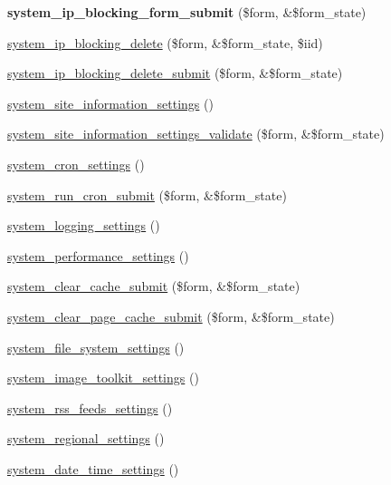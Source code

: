 \begin{DoxyCompactItemize}
\item 
\hypertarget{system_8admin_8inc_ac75ebe994ba888d8792bea1a8a37cf1e}{
{\bfseries system\_\-ip\_\-blocking\_\-form\_\-submit} (\$form, \&\$form\_\-state)}
\label{system_8admin_8inc_ac75ebe994ba888d8792bea1a8a37cf1e}

\item 
\hyperlink{system_8admin_8inc_a15ba20664b3e8b66e0f0a4d8b54e2f60}{system\_\-ip\_\-blocking\_\-delete} (\$form, \&\$form\_\-state, \$iid)
\item 
\hyperlink{system_8admin_8inc_af7847cfa490010815a7f39b139aececc}{system\_\-ip\_\-blocking\_\-delete\_\-submit} (\$form, \&\$form\_\-state)
\item 
\hyperlink{group__forms_ga80e6b3130e47d51243151f1aa04742a3}{system\_\-site\_\-information\_\-settings} ()
\item 
\hyperlink{system_8admin_8inc_abf9e67e3196d40a164cfacba18613b28}{system\_\-site\_\-information\_\-settings\_\-validate} (\$form, \&\$form\_\-state)
\item 
\hyperlink{group__forms_ga62cfa00c0b29765c5c4fa670e222b522}{system\_\-cron\_\-settings} ()
\item 
\hyperlink{group__forms_ga81d2d4dbfd508cdcafdd808cda332b7c}{system\_\-run\_\-cron\_\-submit} (\$form, \&\$form\_\-state)
\item 
\hyperlink{group__forms_ga3404b7ca761c74436c88ce61aa664c4d}{system\_\-logging\_\-settings} ()
\item 
\hyperlink{group__forms_ga47b1f34bfff2f44fd22cfc866bff59d7}{system\_\-performance\_\-settings} ()
\item 
\hyperlink{group__forms_ga07cc959f377e07b079d9875fc5c4b1b7}{system\_\-clear\_\-cache\_\-submit} (\$form, \&\$form\_\-state)
\item 
\hyperlink{group__forms_ga583e36fa591f3e82feae6bf41b597aac}{system\_\-clear\_\-page\_\-cache\_\-submit} (\$form, \&\$form\_\-state)
\item 
\hyperlink{group__forms_gab0199bde08bcb49ff536dd4987718632}{system\_\-file\_\-system\_\-settings} ()
\item 
\hyperlink{group__forms_gaefe85833f426aa428f4ac75d641d7631}{system\_\-image\_\-toolkit\_\-settings} ()
\item 
\hyperlink{group__forms_gacff83234fa52dbaaf85c122bd300a374}{system\_\-rss\_\-feeds\_\-settings} ()
\item 
\hyperlink{group__forms_gac25147c52d45f3bfa503aaac07287826}{system\_\-regional\_\-settings} ()
\item 
\hyperlink{group__forms_ga2c5e3711c4a19fa4759efcee41487070}{system\_\-date\_\-time\_\-settings} ()

\end{DoxyCompactItemize}
